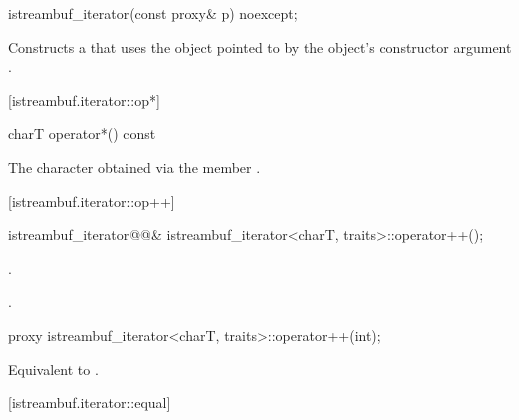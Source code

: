 %
\begin{itemdecl}
istreambuf_iterator(const proxy& p) noexcept;
\end{itemdecl}

\begin{itemdescr}
\pnum
\effects
Constructs a
that uses the
object pointed to by the
object's constructor argument .
\end{itemdescr}

[istreambuf.iterator::op*]{}

%
\begin{itemdecl}
charT operator*() const
\end{itemdecl}

\begin{itemdescr}
\pnum
\returns
The character obtained via the
member
.
\end{itemdescr}

[istreambuf.iterator::op++]{}

%
\begin{itemdecl}
istreambuf_iterator@@&
    istreambuf_iterator<charT, traits>::operator++();
\end{itemdecl}

\begin{itemdescr}
\pnum
\effects {}
.

\pnum
\returns
{}.
\end{itemdescr}

%
%
\begin{itemdecl}
proxy istreambuf_iterator<charT, traits>::operator++(int);
\end{itemdecl}

\begin{itemdescr}
\pnum
\effects Equivalent to
.
\end{itemdescr}

[istreambuf.iterator::equal]{}

